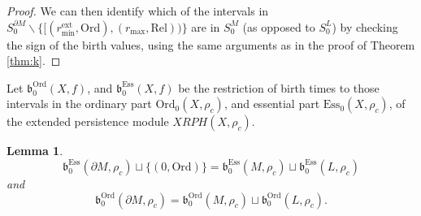 \documentclass[a4paper,11pt]{article}
\newtheorem{lemma}[theorem]{Lemma}
\theoremstyle{definition}
\newcommand{\Ord}{\textrm{Ord}}
\newcommand{\Ess}{\textrm{Ess}}
\begin{document}
\begin{proof}
We can then identify which of the intervals in $S_{0}^{\partial M}\backslash \{[(r_{\min}^\mathrm{ext},\text{Ord}),(r_{\max},\text{Rel}))\}$ are in $S_{0}^M$ (as opposed to $S_{0}^L$) by checking the sign of the birth values, using the same arguments as in the proof of Theorem \ref{thm:k}.
\end{proof}

Let $\mathfrak{b}_0^{\Ord}(X,f)$, and $\mathfrak{b}_0^{\Ess}(X,f)$ be the restriction of birth times to those intervals in the ordinary part $\Ord_0(X,\rho_c)$, and essential part $\Ess_0(X,\rho_c)$, of the extended persistence module $XRPH(X, \rho_c)$.

\begin{lemma}\label{lem:Ord0births}
$$\mathfrak{b}_0^{\Ess}(\partial M,\rho_c) \sqcup \{(0, \Ord)\}=\mathfrak{b}_0^{\Ess}(M,\rho_c)\sqcup \mathfrak{b}_0^{\Ess}(L,\rho_c)$$ and 
$$\mathfrak{b}_0^{\Ord}(\partial M,\rho_c)=\mathfrak{b}_0^{\Ord}(M,\rho_c)\sqcup \mathfrak{b}_0^{\Ord}(L,\rho_c).$$
\end{lemma}
\end{document}
